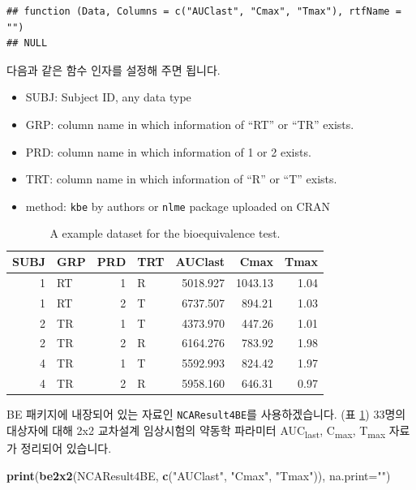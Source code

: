 \documentclass[
  10pt,
]{krantz}
\makeatletter
\newenvironment{Shaded}{\begin{snugshade}}{\end{snugshade}}
\newcommand{\DataTypeTok}[1]{\textcolor[rgb]{0.13,0.29,0.53}{#1}}
\newcommand{\KeywordTok}[1]{\textcolor[rgb]{0.13,0.29,0.53}{\textbf{#1}}}
\newcommand{\NormalTok}[1]{#1}
\newcommand{\StringTok}[1]{\textcolor[rgb]{0.31,0.60,0.02}{#1}}
\providecommand{\tightlist}{%
  \setlength{\itemsep}{0pt}\setlength{\parskip}{0pt}}
\newenvironment{kframe}{%
\medskip{}
\setlength{\fboxsep}{.8em}
 \def\at@end@of@kframe{}%
 \ifinner\ifhmode%
  \def\at@end@of@kframe{\end{minipage}}%
  \begin{minipage}{\columnwidth}%
 \fi\fi%
 \def\FrameCommand##1{\hskip\@totalleftmargin \hskip-\fboxsep
 \colorbox{shadecolor}{##1}\hskip-\fboxsep
     \hskip-\linewidth \hskip-\@totalleftmargin \hskip\columnwidth}%
 \MakeFramed {\advance\hsize-\width
   \@totalleftmargin\z@ \linewidth\hsize
   \@setminipage}}%
 {\par\unskip\endMakeFramed%
 \at@end@of@kframe}
\renewenvironment{Shaded}{\begin{kframe}}{\end{kframe}}
\makeatother
\begin{document}
\begin{verbatim}
## function (Data, Columns = c("AUClast", "Cmax", "Tmax"), rtfName = "") 
## NULL
\end{verbatim}

다음과 같은 함수 인자를 설정해 주면 됩니다.

\begin{itemize}
\tightlist
\item
  SUBJ: Subject ID, any data type
\item
  GRP: column name in which information of ``RT'' or ``TR'' exists.
\item
  PRD: column name in which information of 1 or 2 exists.
\item
  TRT: column name in which information of ``R'' or ``T'' exists.
\item
  method: \texttt{kbe} by authors or \texttt{nlme} package uploaded on CRAN
\end{itemize}

\begin{table}

\caption{\label{tab:beconcdata}A example dataset for the bioequivalence test.}
\centering
\begin{tabular}[t]{r|l|r|l|r|r|r}
\hline
SUBJ & GRP & PRD & TRT & AUClast & Cmax & Tmax\\
\hline
1 & RT & 1 & R & 5018.927 & 1043.13 & 1.04\\
\hline
1 & RT & 2 & T & 6737.507 & 894.21 & 1.03\\
\hline
2 & TR & 1 & T & 4373.970 & 447.26 & 1.01\\
\hline
2 & TR & 2 & R & 6164.276 & 783.92 & 1.98\\
\hline
4 & TR & 1 & T & 5592.993 & 824.42 & 1.97\\
\hline
4 & TR & 2 & R & 5958.160 & 646.31 & 0.97\\
\hline
\end{tabular}
\end{table}

BE 패키지에 내장되어 있는 자료인 \texttt{NCAResult4BE}를 사용하겠습니다. (표 \ref{tab:beconcdata})
33명의 대상자에 대해 2x2 교차설계 임상시험의 약동학 파라미터 AUC\textsubscript{last}, C\textsubscript{max}, T\textsubscript{max} 자료가 정리되어 있습니다.

\begin{Shaded}
\begin{Highlighting}[]
\KeywordTok{print}\NormalTok{(}\KeywordTok{be2x2}\NormalTok{(NCAResult4BE, }\KeywordTok{c}\NormalTok{(}\StringTok{"AUClast"}\NormalTok{, }\StringTok{"Cmax"}\NormalTok{, }\StringTok{"Tmax"}\NormalTok{)), }\DataTypeTok{na.print=}\StringTok{""}\NormalTok{) }
\end{Highlighting}
\end{Shaded}
\end{document}
